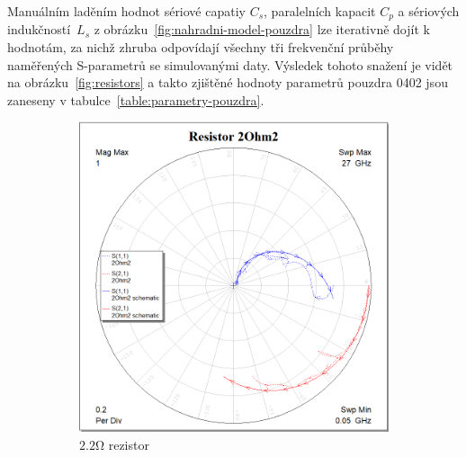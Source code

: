 \documentclass[11pt,a4paper]{article}
\newcommand{\Ohm}{\mathrm{\Omega}}
\begin{document}
Manuálním laděním hodnot sériové capatiy $C_s$, paralelních kapacit $C_p$ a sériových indukčností~$L_s$ z obrázku~\ref{fig:nahradni-model-pouzdra} lze iterativně dojít k hodnotám, za nichž zhruba odpovídají všechny tři frekvenční průběhy naměřených S-parametrů se simulovanými daty. Výsledek tohoto snažení je vidět na obrázku~\ref{fig:resistors} a takto zjištěné hodnoty parametrů pouzdra 0402 jsou zaneseny v tabulce~\ref{table:parametry-pouzdra}.
\begin{figure}[!ht]
    \centering
\begin{subfigure}{0.45\textwidth}
    \centering
    \includegraphics[width=\textwidth]{src/resistor-2Ohm2.png}
    \caption{\label{fig:resistor-2Ohm2}$2.2\Ohm$ rezistor}
\end{subfigure}
\begin{subfigure}{0.45\textwidth}
    \centering

\end{subfigure}
\end{figure}
\end{document}
